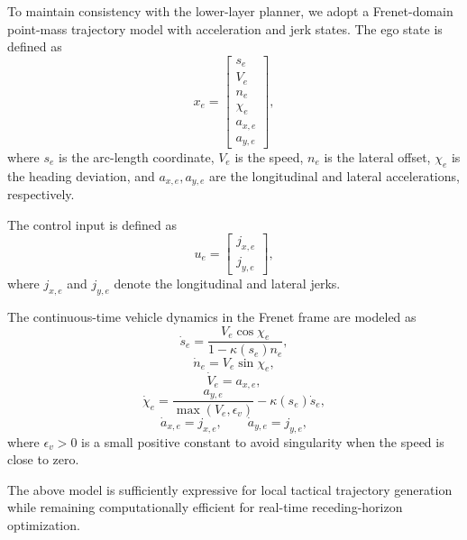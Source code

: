 \documentclass[final ,3p, times]{elsarticle}
\begin{document}
To maintain consistency with the lower-layer planner, we adopt a Frenet-domain point-mass trajectory model with acceleration and jerk states. The ego state is defined as
\begin{equation}
x_e =
\begin{bmatrix}
s_e \\
V_e \\
n_e \\
\chi_e \\
a_{x,e} \\
a_{y,e}
\end{bmatrix},
\label{eq:ego_state}
\end{equation}
where $s_e$ is the arc-length coordinate, $V_e$ is the speed, $n_e$ is the lateral offset, $\chi_e$ is the heading deviation, and $a_{x,e},a_{y,e}$ are the longitudinal and lateral accelerations, respectively.

The control input is defined as
\begin{equation}
u_e=
\begin{bmatrix}
j_{x,e}\\
j_{y,e}
\end{bmatrix},
\label{eq:ego_control}
\end{equation}
where $j_{x,e}$ and $j_{y,e}$ denote the longitudinal and lateral jerks.

The continuous-time vehicle dynamics in the Frenet frame are modeled as
\begin{equation}
\dot s_e = \frac{V_e \cos\chi_e}{1-\kappa(s_e)n_e},
\label{eq:sdot}
\end{equation}
\begin{equation}
\dot n_e = V_e \sin\chi_e,
\label{eq:ndot}
\end{equation}
\begin{equation}
\dot V_e = a_{x,e},
\label{eq:vdot}
\end{equation}
\begin{equation}
\dot \chi_e = \frac{a_{y,e}}{\max(V_e,\epsilon_v)} - \kappa(s_e)\dot s_e,
\label{eq:chidot}
\end{equation}
\begin{equation}
\dot a_{x,e} = j_{x,e},
\qquad
\dot a_{y,e} = j_{y,e},
\label{eq:axaydot}
\end{equation}
where $\epsilon_v>0$ is a small positive constant to avoid singularity when the speed is close to zero.

The above model is sufficiently expressive for local tactical trajectory generation while remaining computationally efficient for real-time receding-horizon optimization.
\end{document}
